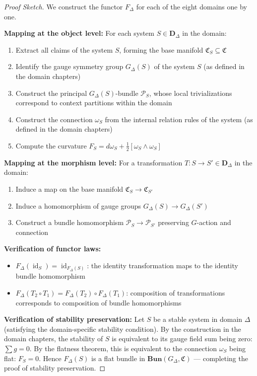 \documentclass[12pt,a4paper]{article}
\theoremstyle{plain}
\theoremstyle{definition}
\newcommand{\Pcal}{\mathcal{P}}
\newcommand{\curv}{F}
\newcommand{\conn}{\omega}
\newcommand{\BundleCat}{\mathbf{Bun}}
\newcommand{\ClaimSpace}{\mathfrak{C}}
\DeclareMathOperator{\id}{id}
\begin{document}
\begin{proof}[Proof Sketch]
We construct the functor $F_\Delta$ for each of the eight domains one by one.

\textbf{Mapping at the object level:}
For each system $S \in \mathbf{D}_\Delta$ in the domain:
\begin{enumerate}
    \item Extract all claims of the system $S$, forming the base manifold $\ClaimSpace_S \subseteq \ClaimSpace$
    \item Identify the gauge symmetry group $G_\Delta(S)$ of the system $S$ (as defined in the domain chapters)
    \item Construct the principal $G_\Delta(S)$-bundle $\Pcal_S$, whose local trivializations correspond to context partitions within the domain
    \item Construct the connection $\conn_S$ from the internal relation rules of the system (as defined in the domain chapters)
    \item Compute the curvature $\curv_S = d\conn_S + \frac{1}{2}[\conn_S \wedge \conn_S]$
\end{enumerate}

\textbf{Mapping at the morphism level:}
For a transformation $T: S \to S' \in \mathbf{D}_\Delta$ in the domain:
\begin{enumerate}
    \item Induce a map on the base manifold $\ClaimSpace_S \to \ClaimSpace_{S'}$
    \item Induce a homomorphism of gauge groups $G_\Delta(S) \to G_\Delta(S')$
    \item Construct a bundle homomorphism $\Pcal_S \to \Pcal_{S'}$ preserving $G$-action and connection
\end{enumerate}

\textbf{Verification of functor laws:}
\begin{itemize}
    \item $F_\Delta(\id_S) = \id_{F_\Delta(S)}$: the identity transformation maps to the identity bundle homomorphism
    \item $F_\Delta(T_2 \circ T_1) = F_\Delta(T_2) \circ F_\Delta(T_1)$: composition of transformations corresponds to composition of bundle homomorphisms
\end{itemize}

\textbf{Verification of stability preservation:}
Let $S$ be a stable system in domain $\Delta$ (satisfying the domain-specific stability condition).
By the construction in the domain chapters, the stability of $S$ is equivalent to its gauge field sum being zero: $\sum g = 0$.
By the flatness theorem, this is equivalent to the connection $\conn_S$ being flat: $\curv_S = 0$.
Hence $F_\Delta(S)$ is a flat bundle in $\BundleCat(G_\Delta, \ClaimSpace)$ —
completing the proof of stability preservation.


\end{proof}
\end{document}
